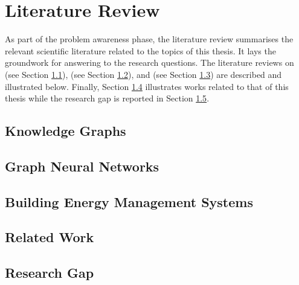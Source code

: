 \chapter{Literature Review}\label{chap:literature-review}
As part of the problem awareness phase, the literature review summarises the relevant scientific literature related to the topics of this thesis.
It lays the groundwork for answering to the research questions.
The literature reviews on  (see Section \ref{sec:knowledge-graphs}),  (see Section \ref{sec:graph-neural-networks}), and  (see Section \ref{sec:building-energy-management-systems}) are described and illustrated below.
Finally, Section \ref{sec:related-work} illustrates works related to that of this thesis while the research gap is reported in Section \ref{sec:research-gap}.

\section{Knowledge Graphs}\label{sec:knowledge-graphs}

%
\section{Graph Neural Networks}\label{sec:graph-neural-networks}

%
\section{Building Energy Management Systems}\label{sec:building-energy-management-systems}

%
\section{Related Work}\label{sec:related-work}

%
\section{Research Gap}\label{sec:research-gap}

